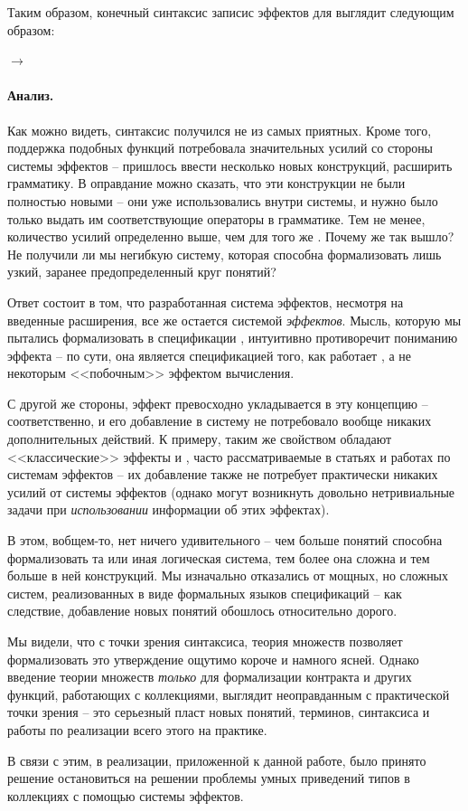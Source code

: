 Таким образом, конечный синтаксис записис эффектов для  выглядит следующим образом:

{
   $\rightarrow$  
}
{}

\paragraph{Анализ.}
Как можно видеть, синтаксис получился не из самых приятных. Кроме того, поддержка подобных функций потребовала значительных усилий со стороны системы эффектов -- пришлось ввести несколько новых конструкций, расширить грамматику. В оправдание можно сказать, что эти конструкции не были полностью новыми -- они уже использовались внутри системы, и нужно было только выдать им соответствующие операторы в грамматике. Тем не менее, количество усилий определенно выше, чем для того же . Почему же так вышло? Не получили ли мы негибкую систему, которая способна формализовать лишь узкий, заранее предопределенный круг понятий?

Ответ состоит в том, что разработанная система эффектов, несмотря на введенные расширения, все же остается системой \emph{эффектов}. Мысль, которую мы пытались формализовать в спецификации , интуитивно противоречит пониманию эффекта -- по сути, она является спецификацией того, как работает , а не некоторым <<побочным>> эффектом вычисления. 

С другой же стороны, эффект  превосходно укладывается в эту концепцию -- соответственно, и его добавление в систему не потребовало вообще никаких дополнительных действий. К примеру, таким же свойством обладают <<классические>> эффекты  и , часто рассматриваемые в статьях и работах по системам эффектов -- их добавление также не потребует практически никаких усилий от системы эффектов (однако могут возникнуть довольно нетривиальные задачи при \emph{использовании} информации об этих эффектах).

В этом, вобщем-то, нет ничего удивительного -- чем больше понятий способна формализовать та или иная логическая система, тем более она сложна и тем больше в ней конструкций. Мы изначально отказались от мощных, но сложных систем, реализованных в виде формальных языков спецификаций -- как следствие, добавление новых понятий обошлось относительно дорого.

Мы видели, что с точки зрения синтаксиса, теория множеств позволяет формализовать это утверждение ощутимо короче и намного ясней. Однако введение теории множеств \emph{только} для формализации контракта  и других функций, работающих с коллекциями, выглядит неоправданным с практической точки зрения -- это серьезный пласт новых понятий, терминов, синтаксиса и работы по реализации всего этого на практике. 

В связи с этим, в реализации, приложенной к данной работе, было принято решение остановиться на решении проблемы умных приведений типов в коллекциях с помощью системы эффектов.